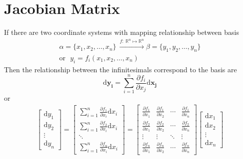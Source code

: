 \documentclass[11pt]{article}
\begin{document}
\section{Jacobian Matrix}
If there are two coordinate systems with mapping relationship between basis
\begin{gather}
    \alpha = \{x_1,x_2,\dots,x_n\}~\xrightarrow{f:~\mathbb{R}^n \mapsto \mathbb{R}^n} \beta = \{y_1,y_2,\dots,y_n\} \\
    \text{or}~~~y_i = f_{i}(x_1,x_2,\dots,x_n)
\end{gather}
Then the relationship between the infinitesimals correspond to the basis are
\begin{equation}
    \text{d}\bm{y_i} = \sum_{i=1}^n \frac{\partial f_i}{\partial x_j}\text{d}\bm{x_j}
\end{equation}
or
\begin{equation}
\begin{aligned}
    \begin{bmatrix}
    \text{d}y_1 \\  \text{d}y_2 \\  \vdots \\  \text{d}y_n
    \end{bmatrix} = \begin{bmatrix}
    \sum_{i=1}^n \frac{\partial f_{1}}{\partial x_i} \text{d}x_i  \\  \sum_{i=1}^n \frac{\partial f_{2}}{\partial x_i} \text{d}x_i \\  \ddots \\ \sum_{i=1}^n \frac{\partial f_{n}}{\partial x_i} \text{d}x_i
    \end{bmatrix} 
    = \begin{bmatrix}
    \frac{\partial f_{1}}{\partial x_1} & \frac{\partial f_{1}}{\partial x_2} & \cdots & \frac{\partial f_{1}}{\partial x_n} \\
    \frac{\partial f_{2}}{\partial x_1} & \frac{\partial f_{2}}{\partial x_2} & \cdots & \frac{\partial f_{2}}{\partial x_n} \\
    \vdots & \vdots & \ddots & \vdots \\
    \frac{\partial f_{n}}{\partial x_1} & \frac{\partial f_{n}}{\partial x_2} & \cdots & \frac{\partial f_{n}}{\partial x_n}
    \end{bmatrix} \begin{bmatrix}
    \text{d}x_1\\  \text{d}x_2 \\ \vdots  \\  \text{d}x_n
    \end{bmatrix}
\end{aligned}
\end{equation}
\end{document}
